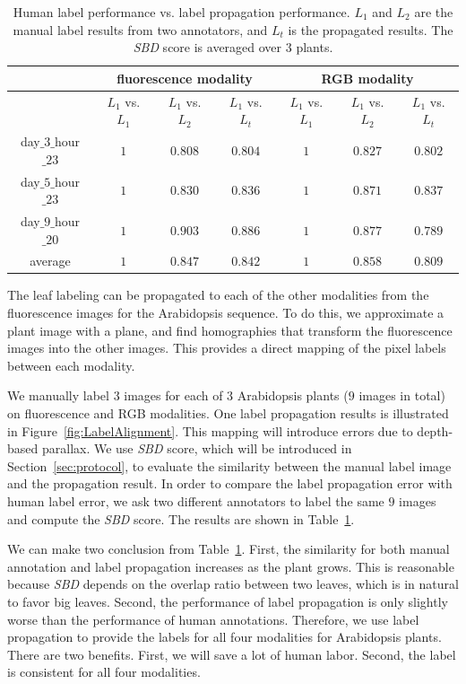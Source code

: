 \begin{table}[t]
\centering
\caption{Human label performance vs. label propagation performance.
$L_1$ and $L_2$ are the manual label results from two annotators, and $L_t$ is the propagated results.
The {\it{SBD}} score is averaged over $3$ plants.}
\begin{tabular}{c|c|c|c|c|c|c}
\hline
    & \multicolumn{3}{c|}{fluorescence modality} & \multicolumn{3}{c}{RGB modality}\\ \hline
    & $L_1$ vs. $L_1$ & $L_1$ vs. $L_2$  & $L_1$ vs. $L_t$ & $L_1$ vs. $L_1$ & $L_1$ vs. $L_2$ & $L_1$ vs. $L_t$ \\ \hline
   day$\_3\_$hour$\_23$ & $1$ & $0.808$ & $0.804$ & $1$ & $0.827$ & $0.802$ \\ \hline
   day$\_5\_$hour$\_23$ & $1$ & $0.830$ & $0.836$ & $1$ & $0.871$ & $0.837$ \\ \hline
   day$\_9\_$hour$\_20$ & $1$ & $0.903$ & $0.886$ & $1$ & $0.877$ & $0.789$ \\ \hline
                   average &          $1$ & $0.847$ & $0.842$ & $1$ & $0.858$ & $0.809$ \\ \hline
\end{tabular}
\label{tab:labelError}
\end{table}

The leaf labeling can be propagated to each of the other modalities from the fluorescence images for the Arabidopsis sequence.  
To do this, we approximate a plant image with a plane, and find homographies that transform the fluorescence images into the other images.  
This provides a direct mapping of the pixel labels between each modality.

We manually label $3$ images for each of $3$ Arabidopsis plants ($9$ images in total) on fluorescence and RGB modalities. 
One label propagation results is illustrated in Figure~\ref{fig:LabelAlignment}.
This mapping will introduce errors due to depth-based parallax.  
We use {\it{SBD}} score, which will be introduced in Section~\ref{sec:protocol}, to evaluate the similarity between the manual label image and the propagation result. 
In order to compare the label propagation error with human label error, we ask two different annotators to label the same $9$ images and compute the {\it{SBD}} score. 
The results are shown in Table~\ref{tab:labelError}.

We can make two conclusion from Table~\ref{tab:labelError}.
First, the similarity for both manual annotation and label propagation increases as the plant grows.
This is reasonable because {\it{SBD}} depends on the overlap ratio between two leaves, which is in natural to favor big leaves. 
Second, the performance of label propagation is only slightly worse than the performance of human annotations. 
Therefore, we use label propagation to provide the labels for all four modalities for Arabidopsis plants. 
There are two benefits. 
First, we will save a lot of human labor. 
Second, the label is consistent for all four modalities. 

